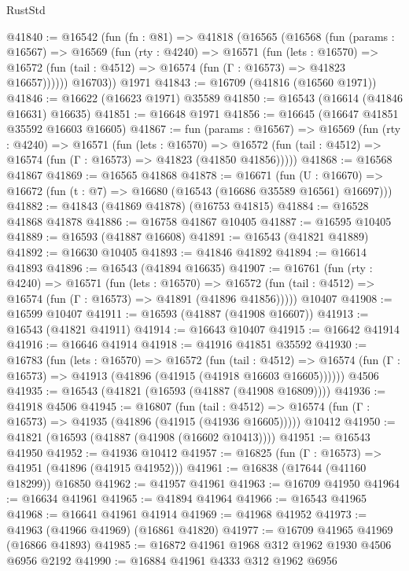 \begin{lexlean}{RustStd}
\begin{coremodule}
@41840 := @16542
    (fun (fn : @81) =>
    @41818
      (@16565
        (@16568
          (fun (params : @16567) =>
          @16569
            (fun (rty : @4240) =>
            @16571
              (fun (lets : @16570) =>
              @16572 (fun (tail : @4512) => @16574 (fun (Γ : @16573) => @41823 @16657))))))
        @16703))
    @1971
@41843 := @16709 (@41816 (@16560 @1971))
@41846 := @16622 (@16623 @1971) @35589
@41850 := @16543 (@16614 (@41846 @16631) @16635)
@41851 := @16648 @1971
@41856 := @16645 (@16647 @41851 @35592 @16603 @16605)
@41867 := fun (params : @16567) =>
  @16569
    (fun (rty : @4240) =>
    @16571
      (fun (lets : @16570) =>
      @16572 (fun (tail : @4512) => @16574 (fun (Γ : @16573) => @41823 (@41850 @41856)))))
@41868 := @16568 @41867
@41869 := @16565 @41868
@41878 := @16671
    (fun (U : @16670) => @16672 (fun (t : @7) => @16680 (@16543 (@16686 @35589 @16561) @16697)))
@41882 := @41843 (@41869 @41878) (@16753 @41815)
@41884 := @16528 @41868 @41878
@41886 := @16758 @41867 @10405
@41887 := @16595 @10405
@41889 := @16593 (@41887 @16608)
@41891 := @16543 (@41821 @41889)
@41892 := @16630 @10405
@41893 := @41846 @41892
@41894 := @16614 @41893
@41896 := @16543 (@41894 @16635)
@41907 := @16761
    (fun (rty : @4240) =>
    @16571
      (fun (lets : @16570) =>
      @16572 (fun (tail : @4512) => @16574 (fun (Γ : @16573) => @41891 (@41896 @41856)))))
    @10407
@41908 := @16599 @10407
@41911 := @16593 (@41887 (@41908 @16607))
@41913 := @16543 (@41821 @41911)
@41914 := @16643 @10407
@41915 := @16642 @41914
@41916 := @16646 @41914
@41918 := @41916 @41851 @35592
@41930 := @16783
    (fun (lets : @16570) =>
    @16572
      (fun (tail : @4512) =>
      @16574 (fun (Γ : @16573) => @41913 (@41896 (@41915 (@41918 @16603 @16605))))))
    @4506
@41935 := @16543 (@41821 (@16593 (@41887 (@41908 @16809))))
@41936 := @41918 @4506
@41945 := @16807
    (fun (tail : @4512) => @16574 (fun (Γ : @16573) => @41935 (@41896 (@41915 (@41936 @16605)))))
    @10412
@41950 := @41821 (@16593 (@41887 (@41908 (@16602 @10413))))
@41951 := @16543 @41950
@41952 := @41936 @10412
@41957 := @16825 (fun (Γ : @16573) => @41951 (@41896 (@41915 @41952)))
@41961 := @16838 (@17644 (@41160 @18299)) @16850
@41962 := @41957 @41961
@41963 := @16709 @41950
@41964 := @16634 @41961
@41965 := @41894 @41964
@41966 := @16543 @41965
@41968 := @16641 @41961 @41914
@41969 := @41968 @41952
@41973 := @41963 (@41966 @41969) (@16861 @41820)
@41977 := @16709 @41965 @41969 (@16866 @41893)
@41985 := @16872 @41961 @1968 @312 @1962 @1930 @4506 @6956 @2192
@41990 := @16884 @41961 @4333 @312 @1962 @6956

\end{coremodule}
\end{lexlean}

